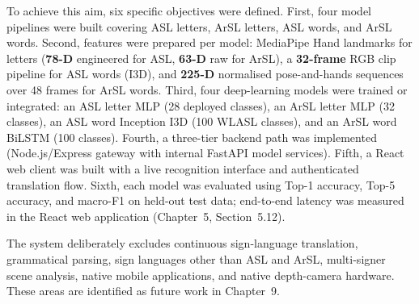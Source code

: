 \noindent To achieve this aim, six specific objectives were defined. First, four model pipelines were built covering ASL letters, ArSL letters, ASL words, and ArSL words. Second, features were prepared per model: MediaPipe Hand landmarks for letters (\textbf{78-D} engineered for ASL, \textbf{63-D} raw for ArSL), a \textbf{32-frame} RGB clip pipeline for ASL words (I3D), and \textbf{225-D} normalised pose-and-hands sequences over 48 frames for ArSL words. Third, four deep-learning models were trained or integrated: an ASL letter MLP (28 deployed classes), an ArSL letter MLP (32 classes), an ASL word Inception I3D (100 WLASL classes), and an ArSL word BiLSTM (100 classes). Fourth, a three-tier backend path was implemented (Node.js/Express gateway with internal FastAPI model services). Fifth, a React web client was built with a live recognition interface and authenticated translation flow. Sixth, each model was evaluated using Top-1 accuracy, Top-5 accuracy, and macro-F1 on held-out test data; end-to-end latency was measured in the React web application (Chapter~5, Section~5.12).\par\vspace{0.4cm}

\noindent The system deliberately excludes continuous sign-language translation, grammatical parsing, sign languages other than ASL and ArSL, multi-signer scene analysis, native mobile applications, and native depth-camera hardware. These areas are identified as future work in Chapter~9.\par\vspace{0.6cm}


